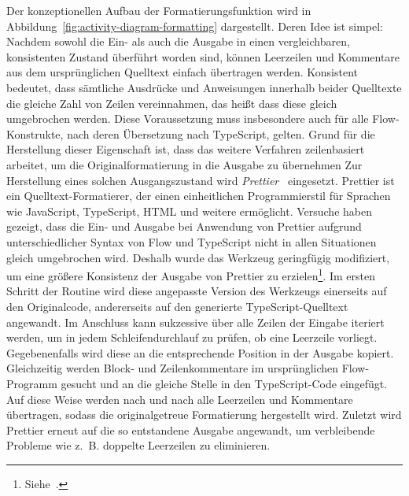 Der konzeptionellen Aufbau der Formatierungsfunktion wird in Abbildung~\ref{fig:activity-diagram-formatting} dargestellt. Deren Idee ist simpel: Nachdem sowohl die Ein- als auch die Ausgabe in einen vergleichbaren, konsistenten Zustand überführt worden sind, können Leerzeilen und Kommentare aus dem ursprünglichen Quelltext einfach übertragen werden. Konsistent bedeutet, dass sämtliche Ausdrücke und Anweisungen innerhalb beider Quelltexte die gleiche Zahl von Zeilen vereinnahmen, das heißt dass diese gleich umgebrochen werden. Diese Voraussetzung muss insbesondere auch für alle Flow-Konstrukte, nach deren Übersetzung nach TypeScript, gelten.
Grund für die Herstellung dieser Eigenschaft ist, dass das weitere Verfahren zeilenbasiert arbeitet, um die Originalformatierung in die Ausgabe zu übernehmen
Zur Herstellung eines solchen Ausgangszustand wird \textit{Prettier}~\autocite{SOFTWARE:PRETTIER} eingesetzt. Prettier ist ein Quelltext-Formatierer, der einen einheitlichen Programmierstil für Sprachen wie JavaScript, TypeScript, HTML und weitere ermöglicht.
Versuche haben gezeigt, dass die Ein- und Ausgabe bei Anwendung von Prettier aufgrund unterschiedlicher Syntax von Flow und TypeScript nicht in allen Situationen gleich umgebrochen wird. Deshalb wurde das Werkzeug geringfügig modifiziert, um eine größere Konsistenz der Ausgabe von Prettier zu erzielen\footnote{Siehe~\autocite{REFLOW_PRETTIER}.}.
Im ersten Schritt der Routine wird diese angepasste Version des Werkzeugs einerseits auf den Originalcode, andererseits auf den generierte TypeScript-Quelltext angewandt. Im Anschluss kann sukzessive über alle Zeilen der Eingabe iteriert werden, um in jedem Schleifendurchlauf zu prüfen, ob eine Leerzeile vorliegt. Gegebenenfalls wird diese an die entsprechende Position in der Ausgabe kopiert. Gleichzeitig werden Block- und Zeilenkommentare im ursprünglichen Flow-Programm gesucht und an die gleiche Stelle in den TypeScript-Code eingefügt. Auf diese Weise werden nach und nach alle Leerzeilen und Kommentare übertragen, sodass die originalgetreue Formatierung hergestellt wird. Zuletzt wird Prettier erneut auf die so entstandene Ausgabe angewandt, um verbleibende Probleme wie z.~B. doppelte Leerzeilen zu eliminieren.
